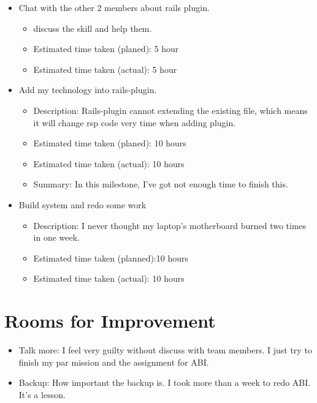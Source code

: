 \begin{itemize}
\begin{itemize}
\begin{itemize}
                \end{itemize}
        \end{itemize}
    \item Chat with the other 2 members about rails plugin.
        \begin{itemize}
            \item discuss the skill and help them. 
            \item Estimated time taken (planed): 5 hour
            \item Estimated time taken (actual): 5 hour
        \end{itemize}
    \item Add my technology into rails-plugin.
        \begin{itemize}
            \item Description: Rails-plugin cannot extending the existing file, which means it will change rsp code very time when adding plugin.
            \item Estimated time taken (planed): 10 hours
            \item Estimated time taken (actual): 10 hours
            \item Summary: In this milestone, I've got not enough time to finish this.
        \end{itemize}
    \item Build system and redo some work
        \begin{itemize}
            \item Description: I never thought my laptop's motherboard burned two times in one week.
            \item Estimated time taken (planned):10 hours
            \item Estimated time taken (actual): 10 hours
        \end{itemize}
\end{itemize}

\section*{Rooms for Improvement}
\begin{itemize}
    \item Talk more: I feel very guilty without discuss with team members. I just try to finish my par mission and the assignment for ABI.
    \item Backup: How important the backup is. I took more than a week to redo ABI. It's a lesson.
\end{itemize}
